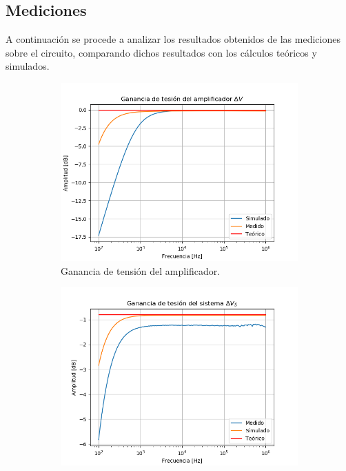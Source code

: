 \subsection{Mediciones}
A continuación se procede a analizar los resultados obtenidos de las mediciones sobre el circuito, comparando dichos resultados con los cálculos teóricos y simulados.
\begin{figure}[H]
\centering
\begin{subfigure}{.49\textwidth}
\centering
	\includegraphics[width=\textwidth]{Imagenes/Av.png}
	\caption{Ganancia de tensión del amplificador.}
\end{subfigure}
\begin{subfigure}{.49\textwidth}
\centering
	\includegraphics[width=\textwidth]{Imagenes/Avs.png}

\end{subfigure}
\end{figure}
